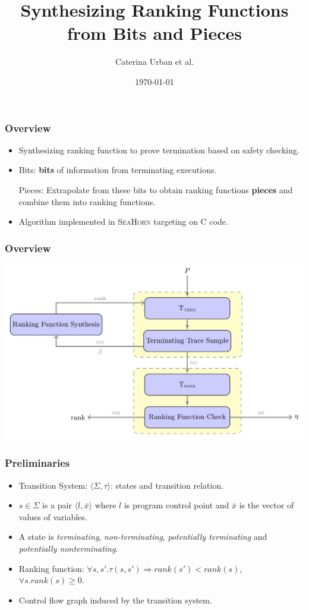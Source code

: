 \documentclass[11pt]{beamer}
\title{Synthesizing Ranking Functions from Bits and Pieces}
\author{Caterina Urban et al.}
\date{\today}
\begin{document}
\maketitle
\begin{frame}\frametitle{Overview}

\begin{itemize}
\item Synthesizing ranking function to prove termination based on safety checking.
\item Bits: \textbf{bits} of information from terminating executions. 

Pieces: Extrapolate from these bits to obtain ranking functions \textbf{pieces} and combine them into ranking functions.

\item Algorithm implemented in \textsc{SeaHorn} targeting on C code.

\end{itemize}
\end{frame}

\begin{frame}\frametitle{Overview}
\begin{center}
\includegraphics[scale=0.26]{Overview.png}
\end{center}
\end{frame}

\begin{frame}\frametitle{Preliminaries}
\begin{itemize}
\item Transition System: $\langle \Sigma ,\tau\rangle$: states and transition relation.
\item $s\in \Sigma$ is a pair $\langle l, \bar{x}\rangle$ where $l$ is program control point and $\bar{x}$ is the vector of values of variables.
\item A state is \textit{terminating}, \textit{non-terminating}, \textit{potentially terminating} and \textit{potentially nonterminating}.
\item Ranking function: $\forall s,s'. \tau(s, s')\Rightarrow rank(s') < rank(s)$, $\forall s. rank(s) \ge 0$.
\item Control flow graph induced by the transition system.
\end{itemize}

\end{frame}
\end{document}
